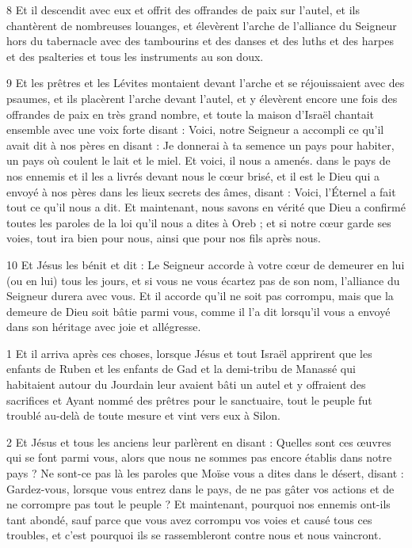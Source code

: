 \par 8 Et il descendit avec eux et offrit des offrandes de paix sur l'autel, et ils chantèrent de nombreuses louanges, et élevèrent l'arche de l'alliance du Seigneur hors du tabernacle avec des tambourins et des danses et des luths et des harpes et des psalteries et tous les instruments au son doux.

\par 9 Et les prêtres et les Lévites montaient devant l'arche et se réjouissaient avec des psaumes, et ils placèrent l'arche devant l'autel, et y élevèrent encore une fois des offrandes de paix en très grand nombre, et toute la maison d'Israël chantait ensemble avec une voix forte disant : Voici, notre Seigneur a accompli ce qu'il avait dit à nos pères en disant : Je donnerai à ta semence un pays pour habiter, un pays où coulent le lait et le miel. Et voici, il nous a amenés. dans le pays de nos ennemis et il les a livrés devant nous le cœur brisé, et il est le Dieu qui a envoyé à nos pères dans les lieux secrets des âmes, disant : Voici, l'Éternel a fait tout ce qu'il nous a dit. Et maintenant, nous savons en vérité que Dieu a confirmé toutes les paroles de la loi qu'il nous a dites à Oreb ; et si notre cœur garde ses voies, tout ira bien pour nous, ainsi que pour nos fils après nous.

\par 10 Et Jésus les bénit et dit : Le Seigneur accorde à votre cœur de demeurer en lui (ou en lui) tous les jours, et si vous ne vous écartez pas de son nom, l'alliance du Seigneur durera avec vous. Et il accorde qu'il ne soit pas corrompu, mais que la demeure de Dieu soit bâtie parmi vous, comme il l'a dit lorsqu'il vous a envoyé dans son héritage avec joie et allégresse.




\par 1 Et il arriva après ces choses, lorsque Jésus et tout Israël apprirent que les enfants de Ruben et les enfants de Gad et la demi-tribu de Manassé qui habitaient autour du Jourdain leur avaient bâti un autel et y offraient des sacrifices et Ayant nommé des prêtres pour le sanctuaire, tout le peuple fut troublé au-delà de toute mesure et vint vers eux à Silon.

\par 2 Et Jésus et tous les anciens leur parlèrent en disant : Quelles sont ces œuvres qui se font parmi vous, alors que nous ne sommes pas encore établis dans notre pays ? Ne sont-ce pas là les paroles que Moïse vous a dites dans le désert, disant : Gardez-vous, lorsque vous entrez dans le pays, de ne pas gâter vos actions et de ne corrompre pas tout le peuple ? Et maintenant, pourquoi nos ennemis ont-ils tant abondé, sauf parce que vous avez corrompu vos voies et causé tous ces troubles, et c'est pourquoi ils se rassembleront contre nous et nous vaincront.

